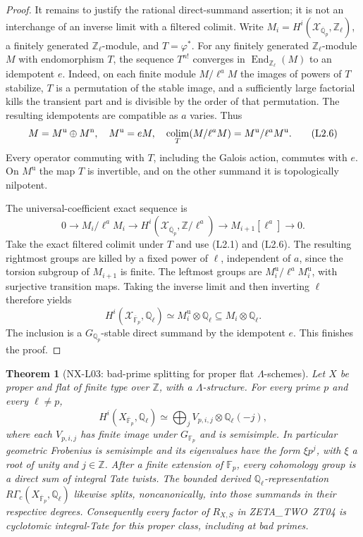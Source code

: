 \documentclass[11pt]{article}
\newtheorem{theorem}{Theorem}[section]
\theoremstyle{remark}
\begin{document}
\begin{proof}
It remains to justify the rational direct-summand assertion; it is
not an interchange of an inverse limit with a filtered colimit.
Write
$M_i=H^i(\mathcal X_{\overline{\mathbb Q}_p},\mathbb Z_\ell)$,
a finitely generated $\mathbb Z_\ell$-module, and $T=\varphi^*$.
For any finitely generated $\mathbb Z_\ell$-module $M$ with
endomorphism $T$, the sequence $T^{n!}$ converges in
$\operatorname{End}_{\mathbb Z_\ell}(M)$ to an idempotent $e$.
Indeed, on each finite module $M/\ell^aM$ the images of powers of $T$
stabilize, $T$ is a permutation of the stable image, and a sufficiently
large factorial kills the transient part and is divisible by the
order of that permutation.  The resulting idempotents are compatible
as $a$ varies.  Thus
\[
 M=M^{\mathrm{u}}\oplus M^{\mathrm{n}},\quad
 M^{\mathrm{u}}=eM,\quad
 \mathop{\rm colim}_T(M/\ell^aM)=M^{\mathrm{u}}/\ell^aM^{\mathrm{u}}.
 \tag{L2.6}
\]
Every operator commuting with $T$, including the Galois action,
commutes with $e$.  On $M^{\mathrm{u}}$ the map $T$ is invertible,
and on the other summand it is topologically nilpotent.

The universal-coefficient exact sequence is
\[
 0\longrightarrow M_i/\ell^aM_i\longrightarrow
 H^i(\mathcal X_{\overline{\mathbb Q}_p},\mathbb Z/\ell^a)
 \longrightarrow M_{i+1}[\ell^a]\longrightarrow0.
\]
Take the exact filtered colimit under $T$ and use (L2.1) and (L2.6).
The resulting rightmost groups are killed by a fixed power of $\ell$,
independent of $a$, since the torsion subgroup of $M_{i+1}$ is finite.
The leftmost groups are $M_i^{\mathrm{u}}/\ell^aM_i^{\mathrm{u}}$,
with surjective transition maps.  Taking the inverse limit and then
inverting $\ell$ therefore yields
\[
 H^i(\mathcal X_{\overline{\mathbb F}_p},\mathbb Q_\ell)
 \simeq M_i^{\mathrm{u}}\otimes\mathbb Q_\ell
 \subseteq M_i\otimes\mathbb Q_\ell.
 \tag{L2.7}
\]
The inclusion is a $G_{\mathbb Q_p}$-stable direct summand by the
idempotent $e$.  This finishes the proof.
\end{proof}

\begin{theorem}[NX-L03: bad-prime splitting for proper flat $\Lambda$-schemes]
\label{NX-L03}
Let $X$ be proper and flat of finite type over $\mathbb Z$, with a
$\Lambda$-structure.  For every prime $p$ and every $\ell\ne p$,
\[
 H^i(X_{\overline{\mathbb F}_p},\mathbb Q_\ell)
 \simeq\bigoplus_j V_{p,i,j}\otimes\mathbb Q_\ell(-j),
 \tag{L3.1}
\]
where each $V_{p,i,j}$ has finite image under
$G_{\mathbb F_p}$ and is semisimple.  In particular geometric
Frobenius is semisimple and its eigenvalues have the form
$\xi p^j$, with $\xi$ a root of unity and $j\in\mathbb Z$.
After a finite extension of $\mathbb F_p$, every cohomology group is
a direct sum of integral Tate twists.  The bounded derived
$\mathbb Q_\ell$-representation $R\Gamma_c(X_{\overline{\mathbb F}_p},\mathbb Q_\ell)$
likewise splits, noncanonically, into those summands in their respective
degrees.  Consequently every factor of $R_{X,S}$ in ZETA\_TWO~ZT04
is cyclotomic integral-Tate for this proper class, including at bad
primes.
\end{theorem}
\end{document}
